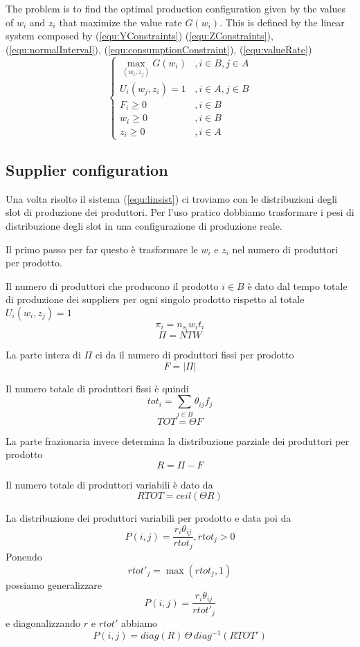 \documentclass[a4paper,11pt]{article}
\begin{document}
The problem is to find the optimal production configuration given by the
values of $ w_i $ and $ z_i $ that maximize the value rate $ G(w_i) $.
This is defined by the linear system composed by
(\ref{equ:YConstraints})
(\ref{equ:ZConstraints}),
(\ref{equ:normalInterval}),
(\ref{equ:consumptionConstraint}),
(\ref{equ:valueRate})
\begin{equation}
\label{equ:linsist}
\left\{
\begin{array}{ll}
\max_{(w_i, z_j)} G(w_i) & , i \in B, j \in A \\
U_i(w_j, z_i) = 1 &  , i \in A, j \in B \\
F_i \ge 0 & , i \in B \\
w_i \ge 0 & , i \in B \\
z_i \ge 0 & , i \in A
\end{array}
\right.
\end{equation}


\subsection{Supplier configuration}

Una volta risolto il sistema (\ref{equ:linsist}) ci troviamo con le distribuzioni degli slot di produzione dei produttori.
Per l'uso pratico dobbiamo trasformare i pesi di distribuzione degli slot
in una configurazione di produzione reale.

Il primo passo per far questo è trasformare le $ w_i $ e $ z_i $ nel numero di produttori per prodotto.

Il numero di produttori che producono il prodotto $ i \in B $ è dato dal tempo totale di produzione dei suppliers per ogni singolo prodotto rispetto al totale $ U_i(w_i, z_j) = 1 $ 
\[
	\pi_i = n_{s_i} w_i t_i
\]
\[
  \Pi = N T W
\]

La parte intera di $ \Pi $ ci da il numero di produttori fissi per
prodotto
\[
	F = |\Pi|
\]

Il numero totale di produttori fissi è quindi
\[
	tot_i = \sum_{j \in B}  \theta_{ij} f_j
\]
\[
	TOT = \Theta F
\]

La parte frazionaria invece determina la distribuzione parziale dei produttori per prodotto
\[
	R = \Pi - F
\]

Il numero totale di produttori variabili è dato da
\[
	RTOT = ceil(\Theta R)
\]

La distribuzione dei produttori variabili per prodotto e data poi da
\[
	P(i,j) = \frac{r_i \theta_{ij}}{rtot_j}, rtot_j > 0
\]
Ponendo
\begin{equation}
\label{eq:ktot}
	rtot'_j = \max(rtot_j, 1)
\end{equation}
possiamo generalizzare 
\[
	P(i,j) = \frac{r_i \theta_{ij}}{rtot'_j}
\]
e diagonalizzando $ r $ e $ rtot' $ abbiamo
\[
P(i,j) = diag(R) \, \Theta \, diag^{-1}(RTOT')
\]
\end{document}
